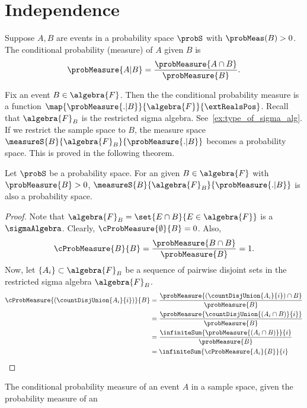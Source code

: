 \section{Independence}
\begin{Definition}[name=Conditional probability measure]
    Suppose $A,B$ are events in a probability space $\probS$ with $\probMeas(B) > 0$. The
    conditional probability (measure) of $A$ given $B$ is 
    \[\probMeasure{A|B} = \frac{\probMeasure{A\cap B}}{\probMeasure{B}}.\]
\end{Definition}
\begin{Remark}
    Fix an event $B \in \algebra{F}$. Then the the conditional probability measure is a 
    function $\map{\probMeasure{.|B}}{\algebra{F}}{\extRealsPos}$. Recall that $\algebra{F}_{B}$ is the
    restricted sigma algebra. See~\ref{ex:type_of_sigma_alg}. If we restrict the sample space to $B$, the measure space
    $\measureS{B}{\algebra{F}_{B}}{\probMeasure{.|B}}$ becomes a probability space. This is proved in the
    following theorem.
\end{Remark}
\begin{Theorem}[name=Conditioned probability space]
    Let $\probS$ be a probability space. For an given $B \in \algebra{F}$ with $\probMeasure{B} > 0$, 
    $\measureS{B}{\algebra{F}_{B}}{\probMeasure{.|B}}$ is also a probability space.
\end{Theorem}
\begin{proof}
    Note that $\algebra{F}_{B} = \set{E\cap B}{E \in \algebra{F}}$ is a $\sigmaAlgebra$.
    Clearly, $\cProbMeasure{\emptyset}{B} = 0$. Also,
    \[\cProbMeasure{B}{B} = \frac{\probMeasure{B\cap B}}{\probMeasure{B}} = 1.\]
    Now, let $\lbrace A_i \rbrace \subset \algebra{F}_{B}$ be a sequence of pairwise disjoint sets in the
    restricted sigma algebra $\algebra{F}_{B}$.
    \begin{align*}
	\cProbMeasure{(\countDisjUnion{A_i}{i})}{B} &= 
	\frac{\probMeasure{(\countDisjUnion{A_i}{i})\cap B}}{\probMeasure{B}} \\
	&= \frac{\probMeasure{\countDisjUnion{(A_i\cap B)}{i}}}{\probMeasure{B}} \\
	&= \frac{\infiniteSum{\probMeasure{(A_i\cap B)}}{i}}{\probMeasure{B}} \\
	&= \infiniteSum{\cProbMeasure{A_i}{B}}{i} \\
    \end{align*}
\end{proof}
The conditional probability measure of an event $A$ in a sample space, given the probability measure of an
